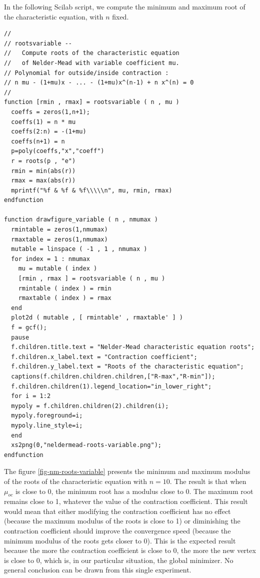 In the following Scilab script, we compute the minimum and 
maximum root of the characteristic equation, with $n$ fixed.

\lstset{language=scilabscript}
\begin{lstlisting}
//
// rootsvariable --
//   Compute roots of the characteristic equation 
//   of Nelder-Mead with variable coefficient mu.
// Polynomial for outside/inside contraction :
// n mu - (1+mu)x - ... - (1+mu)x^(n-1) + n x^(n) = 0
//
function [rmin , rmax] = rootsvariable ( n , mu )
  coeffs = zeros(1,n+1);
  coeffs(1) = n * mu
  coeffs(2:n) = -(1+mu)
  coeffs(n+1) = n
  p=poly(coeffs,"x","coeff")
  r = roots(p , "e")
  rmin = min(abs(r))
  rmax = max(abs(r))
  mprintf("%f & %f & %f\\\\\n", mu, rmin, rmax)
endfunction

function drawfigure_variable ( n , nmumax )
  rmintable = zeros(1,nmumax)
  rmaxtable = zeros(1,nmumax)
  mutable = linspace ( -1 , 1 , nmumax ) 
  for index = 1 : nmumax
    mu = mutable ( index )
    [rmin , rmax ] = rootsvariable ( n , mu )
    rmintable ( index ) = rmin
    rmaxtable ( index ) = rmax
  end
  plot2d ( mutable , [ rmintable' , rmaxtable' ] )
  f = gcf();
  pause
  f.children.title.text = "Nelder-Mead characteristic equation roots";
  f.children.x_label.text = "Contraction coefficient";
  f.children.y_label.text = "Roots of the characteristic equation";
  captions(f.children.children.children,["R-max","R-min"]);
  f.children.children(1).legend_location="in_lower_right";
  for i = 1:2
  mypoly = f.children.children(2).children(i);
  mypoly.foreground=i;
  mypoly.line_style=i;
  end
  xs2png(0,"neldermead-roots-variable.png");
endfunction

\end{lstlisting}

The figure \ref{fig-nm-roots-variable} presents the minimum
and maximum modulus of the roots of the characteristic equation
with $n=10$. The result is that when $\mu_{oc}$ is close to 0, the 
minimum root has a modulus close to 0. The maximum root remains close to 
1, whatever the value of the contraction coefficient.
This result would mean that either modifying the contraction
coefficient has no effect (because the maximum modulus of the roots 
is close to 1) or diminishing the contraction coefficient should 
improve the convergence speed (because the minimum modulus of the 
roots gets closer to 0). This is the expected result because
the more the contraction coefficient is close to 0, the more the new 
vertex is close to 0, which is, in our particular situation, the 
global minimizer. No general conclusion can be drawn from this single 
experiment.

